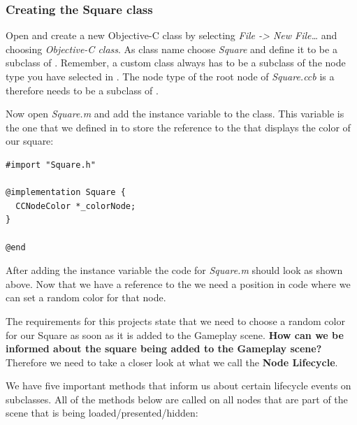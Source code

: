 \subsubsection{Creating the Square class}
Open \xcode{} and create a new Objective-C class by selecting \textit{File ->
New File\ldots} and choosing \textit{Objective-C class}. As class name choose
\textit{Square} and define it to be a subclass of \ccnode{}. Remember, a custom
class always has to be a subclass of the node type you have selected in \SB{}.
The node type of the root node of \textit{Square.ccb} is a \ccnode{} therefore
 needs to be a subclass of \ccnode{}.

Now open \textit{Square.m} and add the instance variable
 to the  class. This variable is the
one that we defined in \SB{} to store the reference to the
 that displays the color of our square:

\begin{lstlisting}
#import "Square.h"

@implementation Square {
  CCNodeColor *_colorNode;
}

@end
\end{lstlisting} 
After adding the instance variable the code for \textit{Square.m} should look as
shown above. Now that we have a reference to the  we
need a position in code where we can set a random color for that node.

The requirements for this projects state that we need to choose a random color
for our Square as soon as it is added to the Gameplay scene. \textbf{How can we
be informed about the square being added to the Gameplay scene?} Therefore we
need to take a closer look at what we call the \textbf{Node
Lifecycle}.

We have five important methods that inform us about certain lifecycle events on
\ccnode{} subclasses. All of the methods below are called on all nodes that are
part of the scene that is being loaded/presented/hidden:

